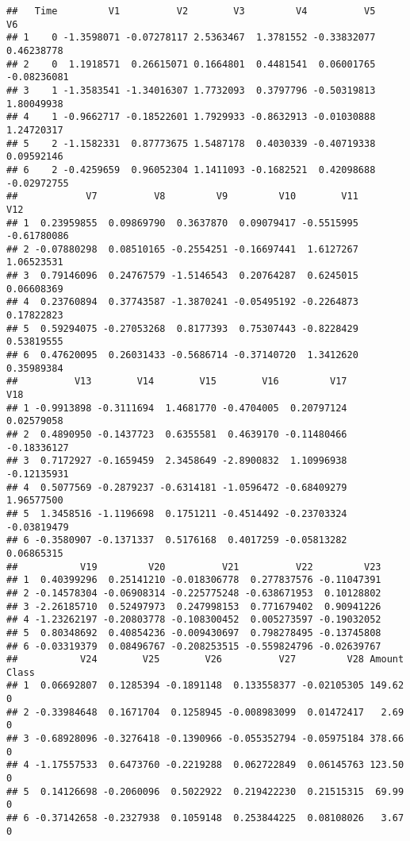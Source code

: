 \documentclass[]{article}
\begin{document}
\begin{verbatim}
##   Time         V1          V2        V3         V4          V5          V6
## 1    0 -1.3598071 -0.07278117 2.5363467  1.3781552 -0.33832077  0.46238778
## 2    0  1.1918571  0.26615071 0.1664801  0.4481541  0.06001765 -0.08236081
## 3    1 -1.3583541 -1.34016307 1.7732093  0.3797796 -0.50319813  1.80049938
## 4    1 -0.9662717 -0.18522601 1.7929933 -0.8632913 -0.01030888  1.24720317
## 5    2 -1.1582331  0.87773675 1.5487178  0.4030339 -0.40719338  0.09592146
## 6    2 -0.4259659  0.96052304 1.1411093 -0.1682521  0.42098688 -0.02972755
##            V7          V8         V9         V10        V11         V12
## 1  0.23959855  0.09869790  0.3637870  0.09079417 -0.5515995 -0.61780086
## 2 -0.07880298  0.08510165 -0.2554251 -0.16697441  1.6127267  1.06523531
## 3  0.79146096  0.24767579 -1.5146543  0.20764287  0.6245015  0.06608369
## 4  0.23760894  0.37743587 -1.3870241 -0.05495192 -0.2264873  0.17822823
## 5  0.59294075 -0.27053268  0.8177393  0.75307443 -0.8228429  0.53819555
## 6  0.47620095  0.26031433 -0.5686714 -0.37140720  1.3412620  0.35989384
##          V13        V14        V15        V16         V17         V18
## 1 -0.9913898 -0.3111694  1.4681770 -0.4704005  0.20797124  0.02579058
## 2  0.4890950 -0.1437723  0.6355581  0.4639170 -0.11480466 -0.18336127
## 3  0.7172927 -0.1659459  2.3458649 -2.8900832  1.10996938 -0.12135931
## 4  0.5077569 -0.2879237 -0.6314181 -1.0596472 -0.68409279  1.96577500
## 5  1.3458516 -1.1196698  0.1751211 -0.4514492 -0.23703324 -0.03819479
## 6 -0.3580907 -0.1371337  0.5176168  0.4017259 -0.05813282  0.06865315
##           V19         V20          V21          V22         V23
## 1  0.40399296  0.25141210 -0.018306778  0.277837576 -0.11047391
## 2 -0.14578304 -0.06908314 -0.225775248 -0.638671953  0.10128802
## 3 -2.26185710  0.52497973  0.247998153  0.771679402  0.90941226
## 4 -1.23262197 -0.20803778 -0.108300452  0.005273597 -0.19032052
## 5  0.80348692  0.40854236 -0.009430697  0.798278495 -0.13745808
## 6 -0.03319379  0.08496767 -0.208253515 -0.559824796 -0.02639767
##           V24        V25        V26          V27         V28 Amount Class
## 1  0.06692807  0.1285394 -0.1891148  0.133558377 -0.02105305 149.62     0
## 2 -0.33984648  0.1671704  0.1258945 -0.008983099  0.01472417   2.69     0
## 3 -0.68928096 -0.3276418 -0.1390966 -0.055352794 -0.05975184 378.66     0
## 4 -1.17557533  0.6473760 -0.2219288  0.062722849  0.06145763 123.50     0
## 5  0.14126698 -0.2060096  0.5022922  0.219422230  0.21515315  69.99     0
## 6 -0.37142658 -0.2327938  0.1059148  0.253844225  0.08108026   3.67     0
\end{verbatim}
\end{document}
